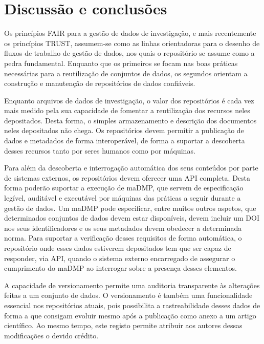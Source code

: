 \documentclass[sigconf,nonacm]{acmart}
\begin{document}


\section{Discussão e conclusões} %
\label{sec:discussao_e_conclusoes}



Os princípios \gls{FAIR} para a gestão de dados de investigação, e mais recentemente os princípios \gls{TRUST}, assumem-se como as linhas orientadoras para o desenho de fluxos de trabalho de gestão de dados, nos quais o repositório se assume como a pedra fundamental. Enquanto que os primeiros se focam nas boas práticas necessárias para a reutilização de conjuntos de dados, os segundos orientam a construção e manutenção de repositórios de dados confiáveis.

Enquanto arquivos de dados de investigação, o valor dos repositórios é cada vez mais medido pela sua capacidade de fomentar a reutilização dos recursos neles depositados. Desta forma, o simples armazenamento e descrição dos documentos neles depositados não chega. Os repositórios devem permitir a publicação de dados e metadados de forma interoperável, de forma a suportar a descoberta desses recursos tanto por seres humanos como por máquinas.

Para além da descoberta e interrogação automática dos seus conteúdos por parte de sistemas externos, os repositórios devem oferecer uma \gls{API} completa. Desta forma poderão suportar a execução de \gls{maDMP}, que servem de especificação legível, auditável e executável por máquinas das práticas a seguir durante a gestão de dados. Um \gls{maDMP} pode especificar, entre muitos outros aspetos, que determinados conjuntos de dados devem estar disponíveis, devem incluir um \gls{DOI} nos seus identificadores e os seus metadados devem obedecer a determinada norma. Para suportar a verificação desses requisitos de forma automática, o repositório onde esses dados estiverem depositados tem que ser capaz de responder, via \gls{API}, quando o sistema externo encarregado de assegurar o cumprimento do \gls{maDMP} ao interrogar sobre a presença desses elementos.

A capacidade de versionamento permite uma auditoria transparente às alterações feitas a um conjunto de dados. O versionamento é também uma funcionalidade essencial nos repositórios atuais, pois possibilita a rastreabilidade desses dados de forma a que consigam evoluir mesmo após a publicação como anexo a um artigo científico. Ao mesmo tempo, este registo permite atribuir aos autores dessas modificações o devido crédito.
\end{document}
